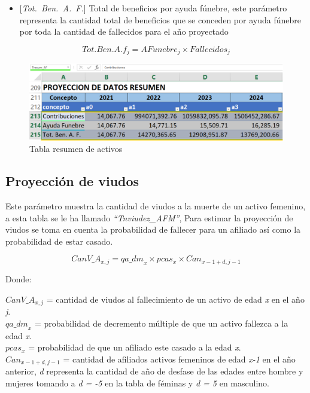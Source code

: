 \documentclass[
  letterpaper,
  DIV=11,
  numbers=noendperiod]{scrreprt}
\providecommand{\tightlist}{%
  \setlength{\itemsep}{0pt}\setlength{\parskip}{0pt}}\usepackage{longtable,booktabs,array}
\begin{document}
\begin{itemize}
\tightlist
\item
  {[}\emph{Tot.~Ben.~A.~F.}{]} Total de beneficios por ayuda fúnebre,
  este parámetro representa la cantidad total de beneficios que se
  conceden por ayuda fúnebre por toda la cantidad de fallecidos para el
  año proyectado
\end{itemize}

\begin{equation}
Tot.Ben.A.f_j=AFunebre_j\times{Fallecidos}_j
\end{equation}

\begin{figure}

{\centering \includegraphics{images/F/Img16.png}

}

\caption{Tabla resumen de activos}

\end{figure}

\hypertarget{proyecciuxf3n-de-viudos}{%
\subsection{Proyección de viudos}\label{proyecciuxf3n-de-viudos}}

Este parámetro muestra la cantidad de viudos a la muerte de un activo
femenino, a esta tabla se le ha llamado \emph{``Tnviudez\_AFM''}, Para
estimar la proyección de viudos se toma en cuenta la probabilidad de
fallecer para un afiliado así como la probabilidad de estar casado.

\begin{equation}
CanV\_A_{x,j}={qa\_dm}_x\times pcas_x\times{Can}_{x-1+d,j-1}
\end{equation}

Donde:

\(CanV\_A_{x,j}\) = cantidad de viudos al fallecimiento de un activo de
edad \emph{x} en el año \emph{j}.\\
\({qa\_dm}_x\) = probabilidad de decremento múltiple de que un activo
fallezca a la edad \emph{x}.\\
\(pcas_x\) = probabilidad de que un afiliado este casado a la edad
\emph{x}.\\
\({Can}_{x-1+d,j-1}\) = cantidad de afiliados activos femeninos de edad
\emph{x-1} en el año anterior, \emph{d} representa la cantidad de año de
desfase de las edades entre hombre y mujeres tomando a \emph{d = -5} en
la tabla de féminas y \emph{d = 5} en masculino.
\end{document}
